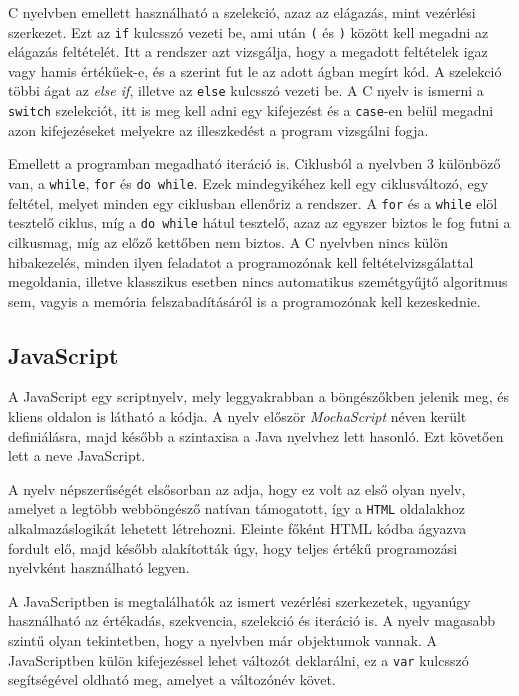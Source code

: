 C nyelvben emellett használható a szelekció, azaz az elágazás, mint vezérlési szerkezet.
Ezt az \texttt{if} kulcsszó vezeti be, ami után \texttt{(} és \texttt{)} között kell megadni az elágazás feltételét.
Itt a rendszer azt vizsgálja, hogy a megadott feltételek igaz vagy hamis értékűek-e, és a szerint fut le az adott ágban megírt kód. A szelekció többi ágat az \textit{else if}, illetve az \texttt{else} kulcsszó vezeti be.
A C nyelv is ismerni a \texttt{switch} szelekciót, itt is meg kell adni egy kifejezést és a \texttt{case}-en belül megadni azon kifejezéseket melyekre az illeszkedést a program vizsgálni fogja.

Emellett a programban megadható iteráció is. Ciklusból a nyelvben 3 különböző van, a \texttt{while}, \texttt{for} és \texttt{do while}. Ezek mindegyikéhez kell egy ciklusváltozó, egy feltétel, melyet minden egy ciklusban ellenőriz a rendszer. A \texttt{for} és a \texttt{while} elöl tesztelő ciklus, míg a \texttt{do while} hátul tesztelő, azaz az egyszer biztos le fog futni a cilkusmag, míg az előző kettőben nem biztos. A C nyelvben nincs külön hibakezelés, minden ilyen feladatot a programozónak kell feltételvizsgálattal megoldania, illetve klasszikus esetben nincs automatikus szemétgyűjtő algoritmus sem, vagyis a memória felszabadításáról is a programozónak kell kezeskednie.

\subsection{JavaScript}

A JavaScript egy scriptnyelv, mely leggyakrabban a böngészőkben jelenik meg, és kliens oldalon is látható a kódja. A nyelv először \textit{MochaScript} néven került definiálásra, majd később a szintaxisa a Java nyelvhez lett hasonló. Ezt követően lett a neve JavaScript.

A nyelv népszerűségét elsősorban az adja, hogy ez volt az első olyan nyelv, amelyet a legtöbb webböngésző natívan támogatott, így a \texttt{HTML} oldalakhoz alkalmazáslogikát lehetett létrehozni. Eleinte főként HTML kódba ágyazva fordult elő, majd később alakították úgy, hogy teljes értékű programozási nyelvként használható legyen.

A JavaScriptben is megtalálhatók az ismert vezérlési szerkezetek, ugyanúgy használható az értékadás, szekvencia, szelekció és iteráció is. A nyelv magasabb szintű olyan tekintetben, hogy a nyelvben már objektumok vannak. A JavaScriptben külön kifejezéssel lehet változót deklarálni, ez a \texttt{var} kulcsszó segítségével oldható meg, amelyet a változónév követ.

